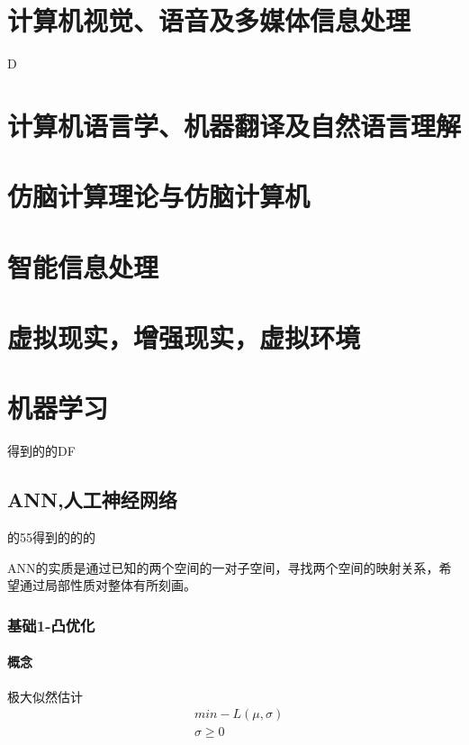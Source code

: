 \documentclass[UTF8]{../computerUniverse}
\begin{document}

\chapter{计算机视觉、语音及多媒体信息处理}
D  

\chapter{计算机语言学、机器翻译及自然语言理解}
\chapter{仿脑计算理论与仿脑计算机}
\chapter{智能信息处理}
\chapter{虚拟现实，增强现实，虚拟环境}
\chapter{机器学习}

得到的的DF  

\section{ANN,人工神经网络}

的55得到的的的

ANN的实质是通过已知的两个空间的一对子空间，寻找两个空间的映射关系，希望通过局部性质对整体有所刻画。


\subsection{基础1-凸优化}
\subsubsection{概念}

极大似然估计
\begin{equation}
\begin{split}
&min -L \left( \mu ,\sigma \right)\\
&\sigma \geqslant 0
\end{split}
\end{equation}
\end{document}
